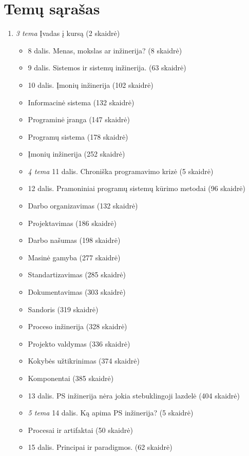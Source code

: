 \chapter{Temų sąrašas}

\begin{enumerate}
  \item \emph{3 tema} Įvadas į kursą (2 skaidrė)
    \begin{itemize}
      \item 8 dalis. Menas, mokslas ar inžinerija? (8 skaidrė)
      \item 9 dalis. Sistemos ir sistemų inžinerija. (63 skaidrė)
      \item 10 dalis. Įmonių inžinerija (102 skaidrė)
      \item Informacinė sistema (132 skaidrė)
      \item Programinė įranga (147 skaidrė)
      \item Programų sistema (178 skaidrė)
      \item Įmonių inžinerija (252 skaidrė)
      \item \emph{4 tema} 11 dalis. Chroniška programavimo krizė (5 skaidrė)
      \item 12 dalis. Pramoniniai programų sistemų kūrimo metodai (96 
        skaidrė)
      \item Darbo organizavimas (132 skaidrė)
      \item Projektavimas (186 skaidrė)
      \item Darbo našumas (198 skaidrė)
      \item Masinė gamyba (277 skaidrė)
      \item Standartizavimas (285 skaidrė)
      \item Dokumentavimas (303 skaidrė)
      \item Sandoris (319 skaidrė)
      \item Proceso inžinerija (328 skaidrė)
      \item Projekto valdymas (336 skaidrė)
      \item Kokybės užtikrinimas (374 skaidrė)
      \item Komponentai (385 skaidrė)
      \item 13 dalis. PS inžinerija nėra jokia stebuklingoji lazdelė
        (404 skaidrė)
      \item \emph{5 tema} 14 dalis. Ką apima PS inžinerija? (5 skaidrė)
      \item Procesai ir artifaktai (50 skaidrė)
      \item 15 dalis. Principai ir paradigmos. (62 skaidrė)
    \end{itemize}
\end{enumerate}

